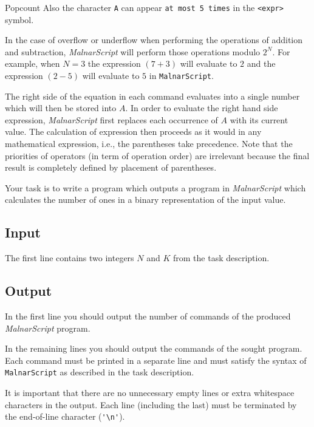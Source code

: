 \begin{statement}[
  problempoints=110,
  timelimit=1 second,
  memorylimit=512 MiB,
]{Popcount}
Also the character \texttt{A} can appear \texttt{at most 5 times} in the
\texttt{<expr>} symbol.

In the case of overflow or underflow when performing the operations of
addition and subtraction, \textit{MalnarScript} will perform those
operations modulo $2^N$. For example, when $N=3$ the expression $(7+3)$ will
evaluate to $2$ and the expression $(2-5)$ will evaluate to $5$ in
\texttt{MalnarScript}.

The right side of the equation in each command evaluates into a single number
which will then be stored into $A$. In order to evaluate the right hand side
expression, \textit{MalnarScript} first replaces each occurrence of $A$ with
its current value. The calculation of expression then proceeds as it would in
any mathematical expression, i.e., the parentheses take precedence. Note that
the priorities of operators (in term of operation order) are irrelevant because
the final result is completely defined by placement of parentheses.

Your task is to write a program which outputs a program in \textit{MalnarScript}
which calculates the number of ones in a binary representation of the input
value.

\subsection*{Input}
The first line contains two integers $N$ and $K$ from the task description.

\subsection*{Output}
In the first line you should output the number of commands of the produced
\textit{MalnarScript} program.

In the remaining lines you should output the commands of the sought program.
Each command must be printed in a separate line and must satisfy the syntax
of \texttt{MalnarScript} as described in the task description.

It is important that there are no unnecessary empty lines or extra whitespace
characters in the output. Each line (including the last) must be terminated by
the end-of-line character (\verb|'\n'|).


\end{statement}
